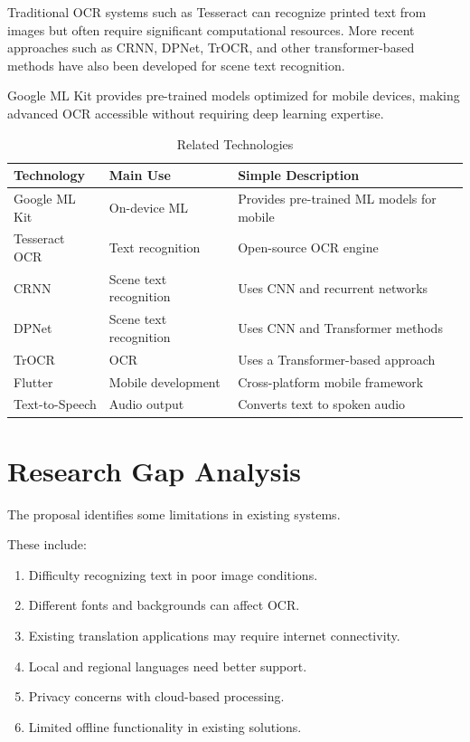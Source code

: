 \documentclass[12pt,a4paper]{report}
\begin{document}
Traditional OCR systems such as Tesseract can recognize printed text from images but often require significant computational resources. More recent approaches such as CRNN, DPNet, TrOCR, and other transformer-based methods have also been developed for scene text recognition.

Google ML Kit provides pre-trained models optimized for mobile devices, making advanced OCR accessible without requiring deep learning expertise.

\begin{table}[H]
\centering
\caption{Related Technologies}
\begin{tabular}{|p{3cm}|p{3.5cm}|p{4.5cm}|}
\hline
\textbf{Technology} & \textbf{Main Use} & \textbf{Simple Description} \\ \hline
Google ML Kit & On-device ML & Provides pre-trained ML models for mobile \\ \hline
Tesseract OCR & Text recognition & Open-source OCR engine \\ \hline
CRNN & Scene text recognition & Uses CNN and recurrent networks \\ \hline
DPNet & Scene text recognition & Uses CNN and Transformer methods \\ \hline
TrOCR & OCR & Uses a Transformer-based approach \\ \hline
Flutter & Mobile development & Cross-platform mobile framework \\ \hline
Text-to-Speech & Audio output & Converts text to spoken audio \\ \hline
\end{tabular}
\end{table}

\section{Research Gap Analysis}

The proposal identifies some limitations in existing systems.

These include:

\begin{enumerate}
    \item Difficulty recognizing text in poor image conditions.
    \item Different fonts and backgrounds can affect OCR.
    \item Existing translation applications may require internet connectivity.
    \item Local and regional languages need better support.
    \item Privacy concerns with cloud-based processing.
    \item Limited offline functionality in existing solutions.
\end{enumerate}
\end{document}
